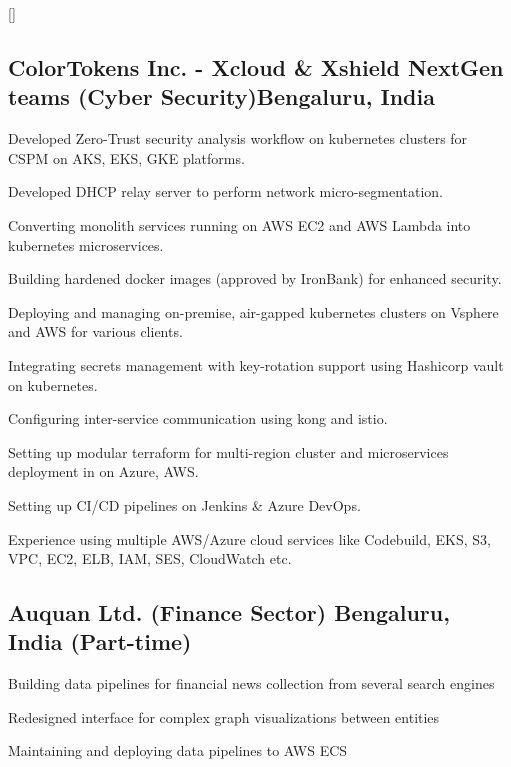 \documentclass[letter,10pt]{article}
\begin{document}
\titlespacing*{\subsubsection}{0em}{0em}{0em}
\titleformat{\subsubsection}{\itshape}{}{0em}{}[]


\subsection{ColorTokens Inc. - Xcloud \& Xshield NextGen teams (Cyber Security)\hfill Bengaluru, India}
\begin{zitemize}
\item Developed Zero-Trust security analysis workflow on kubernetes clusters for CSPM on AKS, EKS, GKE platforms.
\item Developed DHCP relay server to perform network micro-segmentation.
\item Converting monolith services running on AWS EC2 and AWS Lambda into kubernetes microservices.
\item Building hardened docker images (approved by IronBank) for enhanced security.
\item Deploying and managing on-premise, air-gapped kubernetes clusters on Vsphere and AWS for various clients.
\item Integrating secrets management with key-rotation support using Hashicorp vault on kubernetes.
\item Configuring inter-service communication using kong and istio.
\item Setting up modular terraform for multi-region cluster and microservices deployment in on Azure, AWS.
\item Setting up CI/CD pipelines on Jenkins \& Azure DevOps.
\item Experience using multiple AWS/Azure cloud services like Codebuild, EKS, S3, VPC, EC2, ELB, IAM, SES, CloudWatch etc.
\end{zitemize}


\subsection{Auquan Ltd. (Finance Sector) \hfill Bengaluru, India (Part-time)}
\begin{zitemize}
\item Building data pipelines for financial news collection from several search engines
\item Redesigned interface for complex graph visualizations between entities
\item Maintaining and deploying data pipelines to AWS ECS 
\end{zitemize}
\end{document}
